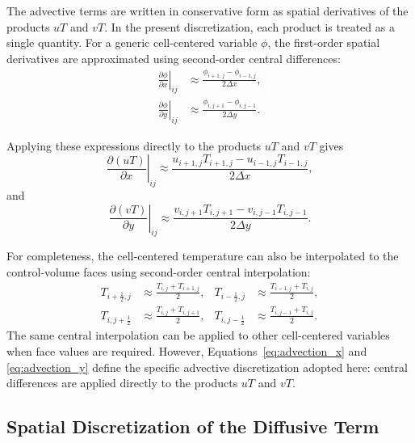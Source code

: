 The advective terms are written in conservative form as
spatial derivatives of the products $uT$ and $vT$. In the
present discretization, each product is treated as a single
quantity. For a generic cell-centered variable $\phi$, the
first-order spatial derivatives are approximated using
second-order central differences:
\begin{align}
\left.\frac{\partial \phi}{\partial x}\right|_{ij}
&\approx
\frac{\phi_{i+1,j}-\phi_{i-1,j}}{2\Delta x},
\label{eq:first_derivative_x}
\\
\left.\frac{\partial \phi}{\partial y}\right|_{ij}
&\approx
\frac{\phi_{i,j+1}-\phi_{i,j-1}}{2\Delta y}.
\label{eq:first_derivative_y}
\end{align}

Applying these expressions directly to the products $uT$
and $vT$ gives
\begin{equation}
\left.\frac{\partial (uT)}{\partial x}\right|_{ij}
\approx
\frac{
u_{i+1,j}T_{i+1,j}
-u_{i-1,j}T_{i-1,j}
}{2\Delta x},
\label{eq:advection_x}
\end{equation}
and
\begin{equation}
\left.\frac{\partial (vT)}{\partial y}\right|_{ij}
\approx
\frac{
v_{i,j+1}T_{i,j+1}
-v_{i,j-1}T_{i,j-1}
}{2\Delta y}.
\label{eq:advection_y}
\end{equation}

For completeness, the cell-centered temperature can also be
interpolated to the control-volume faces using second-order
central interpolation:
\begin{align}
T_{i+\frac{1}{2},j}
&\approx \frac{T_{i,j}+T_{i+1,j}}{2},
&
T_{i-\frac{1}{2},j}
&\approx \frac{T_{i-1,j}+T_{i,j}}{2},
\label{eq:temperature_interpolation_x}
\\
T_{i,j+\frac{1}{2}}
&\approx \frac{T_{i,j}+T_{i,j+1}}{2},
&
T_{i,j-\frac{1}{2}}
&\approx \frac{T_{i,j-1}+T_{i,j}}{2}.
\label{eq:temperature_interpolation_y}
\end{align}
The same central interpolation can be applied to other
cell-centered variables when face values are required.
However, Equations~\eqref{eq:advection_x} and
\eqref{eq:advection_y} define the specific advective
discretization adopted here: central differences are applied
directly to the products $uT$ and $vT$.

\subsection{Spatial Discretization of the Diffusive Term}

